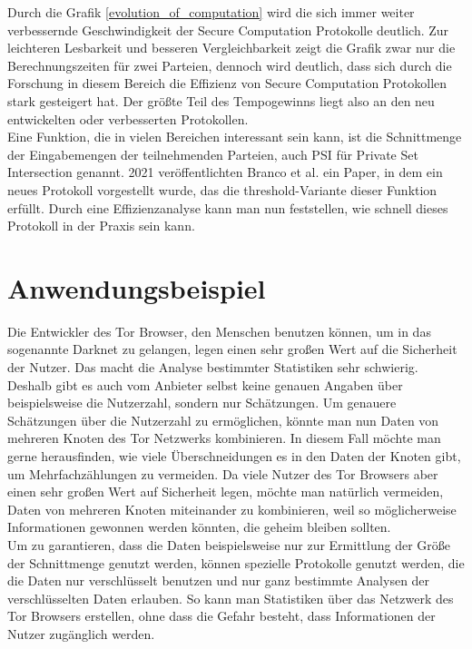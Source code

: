 Durch die Grafik \ref{evolution_of_computation} wird die sich immer weiter verbessernde Geschwindigkeit der Secure Computation Protokolle deutlich. Zur leichteren Lesbarkeit und besseren Vergleichbarkeit zeigt die Grafik zwar nur die Berechnungszeiten für zwei Parteien, dennoch wird deutlich, dass sich durch die Forschung in diesem Bereich die Effizienz von Secure Computation Protokollen stark gesteigert hat. Der größte Teil des Tempogewinns liegt also an den neu entwickelten oder verbesserten Protokollen.\\
Eine Funktion, die in vielen Bereichen interessant sein kann, ist die Schnittmenge der Eingabemengen der teilnehmenden Parteien, auch PSI für \glqq Private Set Intersection\grqq{} genannt. 2021 veröffentlichten Branco et al. \cite{Doettling2021} ein Paper, in dem ein neues Protokoll vorgestellt wurde, das die threshold-Variante dieser Funktion erfüllt. Durch eine Effizienzanalyse kann man nun feststellen, wie schnell dieses Protokoll in der Praxis sein kann.

\section{Anwendungsbeispiel}
Die Entwickler des Tor Browser, den Menschen benutzen können, um in das sogenannte Darknet zu gelangen, legen einen sehr großen Wert auf die Sicherheit der Nutzer. Das macht die Analyse bestimmter Statistiken sehr schwierig. Deshalb gibt es auch vom Anbieter selbst keine genauen Angaben über beispielsweise die Nutzerzahl, sondern nur Schätzungen. Um genauere Schätzungen über die Nutzerzahl zu ermöglichen, könnte man nun Daten von mehreren \glqq Knoten\grqq{} des Tor Netzwerks kombinieren. In diesem Fall möchte man gerne herausfinden, wie viele Überschneidungen es in den Daten der \glqq Knoten\grqq{} gibt, um Mehrfachzählungen zu vermeiden. Da viele Nutzer des Tor Browsers aber einen sehr großen Wert auf Sicherheit legen, möchte man natürlich vermeiden, Daten von mehreren \glqq Knoten\grqq{} miteinander zu kombinieren, weil so möglicherweise Informationen gewonnen werden könnten, die geheim bleiben sollten.\\
Um zu garantieren, dass die Daten beispielsweise nur zur Ermittlung der Größe der Schnittmenge genutzt werden, können spezielle Protokolle genutzt werden, die die Daten nur verschlüsselt benutzen und nur ganz bestimmte  Analysen der verschlüsselten Daten erlauben. So kann man Statistiken über das Netzwerk des Tor Browsers erstellen, ohne dass die Gefahr besteht, dass Informationen der Nutzer zugänglich werden.

